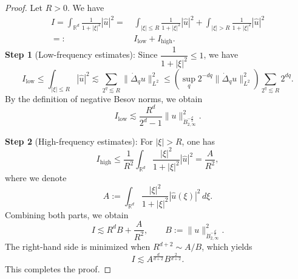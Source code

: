 \documentclass[10pt,a4paper]{amsart}
\begin{document}
\begin{proof}
    Let $R>0$. We have 
\begin{equation}
\begin{aligned}
I = \int_{\mathbb{R}^d } \frac{1}{1+|\xi|^2} |\widehat{u}|^2
= &\,\int_{|\xi|\le R} \frac{1}{1+|\xi|^2} |\widehat{u}|^2
+ \int_{|\xi|>R} \frac{1}{1+|\xi|^2} |\widehat{u}|^2\\
=:&\, I_{\mathrm{low}} + I_{\mathrm{high}}.
\end{aligned}
\end{equation}
\medskip
\noindent\textbf{Step 1} (Low-frequency estimates):
Since $\dfrac{1}{1+|\xi|^2} \le 1$, we have
\[
I_{\mathrm{low}}
\le \int_{|\xi|\le R} |\widehat{u}|^2
\lesssim \sum_{2^q \lesssim R} \|\dot\Delta_q u\|_{L^2}^2
\le \left( \sup_q 2^{-dq} \|\dot\Delta_q u\|_{L^2}^2 \right)
\sum_{2^q \lesssim R} 2^{dq}.
\]
By the definition of negative Besov norms, we obtain
\[
I_{\mathrm{low}} \lesssim \dfrac{R^d}{2^d-1} \|u\|_{\dot B_{2,\infty}^{-\frac{d}{2}}}^2.
\]


\noindent\textbf{Step 2} (High-frequency estimates):
For $|\xi| > R$, one has
\[
I_{\mathrm{high}} \le \frac{1}{R^2} \int_{\mathbb{R}^d } \frac{|\xi|^2}{1+|\xi|^2} |\widehat{u}|^2
= \frac{A}{R^2},
\]
where we denote
\[
A := \int_{\mathbb{R}^d } \frac{|\xi|^2}{1+|\xi|^2} |\widehat{u}(\xi)|^2\, d\xi.
\]
\medskip
Combining both parts, we obtain
\[
I \lesssim R^d B + \frac{A}{R^2},
\qquad
B := \|u\|_{\dot B_{2,\infty}^{-\frac{d}{2}}}^2.
\]
The right-hand side is minimized when $R^{d+2} \sim A/B$, which yields
\[
I \lesssim A^{\frac{d}{d+2}} B^{\frac{2}{d+2}}.
\]
This completes the proof.   
\end{proof}
\end{document}
